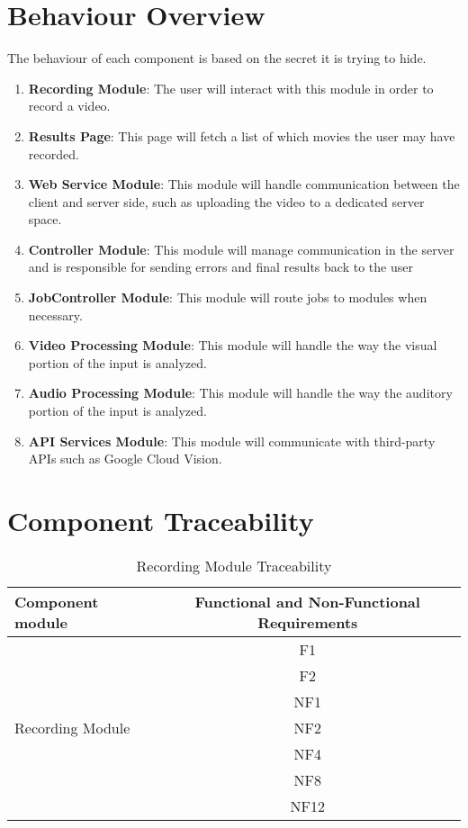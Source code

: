 \documentclass{article}
\begin{document}
\section{Behaviour Overview}
The behaviour of each component is based on the secret it is trying to hide. 
\begin{enumerate}
    \item \textbf{Recording Module}: The user will interact with this module in order to record a video.
    \item \textbf{Results Page}: This page will fetch a list of which movies the user may have recorded.
    \item \textbf{Web Service Module}: This module will handle communication between the client and server side, such as uploading the video to a dedicated server space.
    \item \textbf{Controller Module}: This module will manage communication in the server and is responsible for sending errors and final results back to the user
    \item \textbf{JobController Module}: This module will route jobs to modules when necessary.
    \item \textbf{Video Processing Module}: This module will handle the way the visual portion of the input is analyzed.
    \item \textbf{Audio Processing Module}: This module will handle the way the auditory portion of the input is analyzed.
    \item \textbf{API Services Module}: This module will communicate with third-party APIs such as Google Cloud Vision.
\end{enumerate}

\section{Component Traceability}

\begin{table}[H]
    \caption{Recording Module Traceability}
    \centering
    \begin{tabular}{|l|c|} \hline
        \textbf{Component module} & \textbf{Functional and Non-Functional Requirements} \\ \hline
         \multirow{7}{*}{Recording Module} & F1 \\ \cline{2-2}
         & F2 \\ \cline{2-2}
         & NF1 \\ \cline{2-2}
         & NF2 \\ \cline{2-2}
         & NF4 \\ \cline{2-2}
         & NF8 \\ \cline{2-2}
         & NF12 \\ \hline
    \end{tabular}
    \label{tab:Recording_Traceability}
\end{table}
\end{document}

